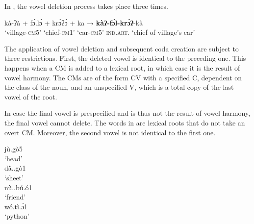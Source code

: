 \documentclass[output=paper]{langscibook}
\begin{document}
In , the vowel deletion process takes place three times.      

 \begin{exe}
    \ex \gll kà-ʔà             +     fɔ́.lɔ́                  + krɔ̀ʔɔ̀            +   ka                  →      \textbf{kàʔ-fɔ́l-krɔ̀ʔ}-kà \label{ex:traore:tripleVowelDeletion:21}\\
            `village-\textsc{cm}5'  {} `chief-\textsc{cm1}' {} `car-\textsc{cm}5'   {}  \textsc{ind.art}.   {}       {‘chief of village’s car’}\\
 \end{exe}
          
The application of vowel deletion and subsequent coda creation are subject to three restrictions. First, the deleted vowel is identical to the preceding one. This happens when a CM is added to a lexical root, in which case it is the result of vowel harmony. The CMs are of the form CV with a specified C, dependent on the class of the noun, and an unspecified V, which is a total copy of the last vowel of the root. 

In case the final vowel is prespecified and is thus not the result of vowel harmony, the final vowel cannot delete. %
The words in  are lexical roots that do not take an overt CM. Moreover, the second vowel is not identical to the first one.

\pagebreak 

\begin{exe}
    \ex \label{ex:traore:lexicalRootsWithoutCM:22}
    \begin{multicols}{4}
    \begin{xlist} 
    \ex  jù.gò5\\
        `head'\\
    \ex dã̀..gò1\\
        `sheet'\\
    \ex nũ̀..bú.ó1\\  
    `friend'\\
    \ex wó.tì.ɔ̀1\\
       `python'\\
  \end{xlist}
    \end{multicols}
 \end{exe}
\end{document}
